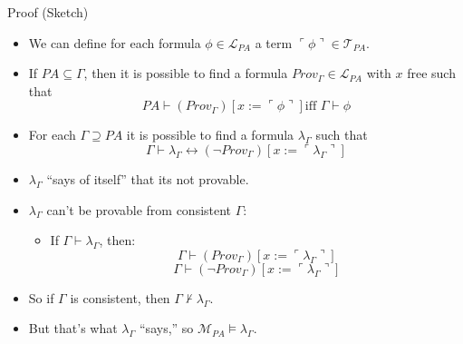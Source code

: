 \begin{frame}{Proof (Sketch)}

  \begin{itemize}
  \item We can define for each formula $\phi\in\mathcal{L}_{PA}$ a
    term $\ulcorner \phi\urcorner\in\mathcal{T}_{PA}$.
  \item If $PA\subseteq \Gamma$, then it is possible to find a formula
    $Prov_\Gamma\in\mathcal{L}_{PA}$ with $x$ free  such
    that \[PA\vdash (Prov_\Gamma)[x:=\ulcorner \phi\urcorner]\text{
        iff }\Gamma\vdash\phi\]
   \item For each $\Gamma\supseteq PA$ it is possible to find a formula
     $\lambda_\Gamma$ such that
     \[\Gamma\vdash \lambda_\Gamma
       \leftrightarrow (\neg
       Prov_\Gamma)[x:=\ulcorner \lambda_\Gamma\urcorner]\]

   \item $\lambda_\Gamma$ ``says of itself'' that its not provable.

   \item $\lambda_\Gamma$ can't be provable from consistent $\Gamma$:

     \begin{itemize}
     \item If $\Gamma\vdash \lambda_\Gamma$, then: \[\Gamma\vdash
       (Prov_\Gamma)[x:=\ulcorner\lambda_\Gamma\urcorner]\]\[\Gamma\vdash
       (\neg Prov_\Gamma)[x:=\ulcorner\lambda_\Gamma\urcorner]\] 
   \end{itemize}

 \item So if $\Gamma$ is consistent, then $\Gamma\nvdash \lambda_\Gamma$.

   \item But that's what $\lambda_\Gamma$ ``says,'' so
     $\mathcal{M}_{PA}\vDash \lambda_\Gamma$.
  \end{itemize}
  
\end{frame}

